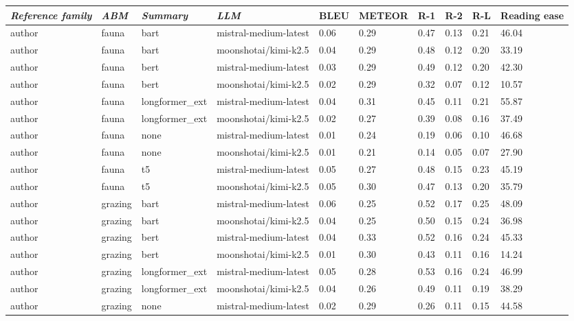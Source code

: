 \begin{tabular}{|l|l|l|l|l|l|l|l|l|l|}
\hline
\textit{\textbf{Reference family}} & \textit{\textbf{ABM}} & \textit{\textbf{Summary}} & \textit{\textbf{LLM}} & BLEU & METEOR & R-1 & R-2 & R-L & Reading ease \\
 \hline
 author & fauna & bart & mistral-medium-latest & 0.06 & 0.29 & 0.47 & 0.13 & 0.21 & 46.04 \\
 \hline
 author & fauna & bart & moonshotai/kimi-k2.5 & 0.04 & 0.29 & 0.48 & 0.12 & 0.20 & 33.19 \\
 \hline
 author & fauna & bert & mistral-medium-latest & 0.03 & 0.29 & 0.49 & 0.12 & 0.20 & 42.30 \\
 \hline
 author & fauna & bert & moonshotai/kimi-k2.5 & 0.02 & 0.29 & 0.32 & 0.07 & 0.12 & 10.57 \\
 \hline
 author & fauna & longformer\_ext & mistral-medium-latest & 0.04 & 0.31 & 0.45 & 0.11 & 0.21 & 55.87 \\
 \hline
 author & fauna & longformer\_ext & moonshotai/kimi-k2.5 & 0.02 & 0.27 & 0.39 & 0.08 & 0.16 & 37.49 \\
 \hline
 author & fauna & none & mistral-medium-latest & 0.01 & 0.24 & 0.19 & 0.06 & 0.10 & 46.68 \\
 \hline
 author & fauna & none & moonshotai/kimi-k2.5 & 0.01 & 0.21 & 0.14 & 0.05 & 0.07 & 27.90 \\
 \hline
 author & fauna & t5 & mistral-medium-latest & 0.05 & 0.27 & 0.48 & 0.15 & 0.23 & 45.19 \\
 \hline
 author & fauna & t5 & moonshotai/kimi-k2.5 & 0.05 & 0.30 & 0.47 & 0.13 & 0.20 & 35.79 \\
 \hline
 author & grazing & bart & mistral-medium-latest & 0.06 & 0.25 & 0.52 & 0.17 & 0.25 & 48.09 \\
 \hline
 author & grazing & bart & moonshotai/kimi-k2.5 & 0.04 & 0.25 & 0.50 & 0.15 & 0.24 & 36.98 \\
 \hline
 author & grazing & bert & mistral-medium-latest & 0.04 & 0.33 & 0.52 & 0.16 & 0.24 & 45.33 \\
 \hline
 author & grazing & bert & moonshotai/kimi-k2.5 & 0.01 & 0.30 & 0.43 & 0.11 & 0.16 & 14.24 \\
 \hline
 author & grazing & longformer\_ext & mistral-medium-latest & 0.05 & 0.28 & 0.53 & 0.16 & 0.24 & 46.99 \\
 \hline
 author & grazing & longformer\_ext & moonshotai/kimi-k2.5 & 0.04 & 0.26 & 0.49 & 0.11 & 0.19 & 38.29 \\
 \hline
 author & grazing & none & mistral-medium-latest & 0.02 & 0.29 & 0.26 & 0.11 & 0.15 & 44.58 \\

\end{tabular}
